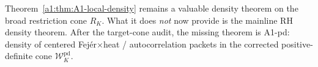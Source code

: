 \begin{remark}\label{rem:a1-support-gap}
Theorem~\ref{a1:thm:A1-local-density} remains a valuable density theorem on the broad restriction cone $R_K$.
What it does \emph{not} now provide is the mainline RH density theorem. After the target-cone audit, the missing theorem is A1-pd: density of centered Fej\'er$\times$heat / autocorrelation packets in the corrected positive-definite cone $\mathcal W_K^{\mathrm{pd}}$.
\end{remark}
